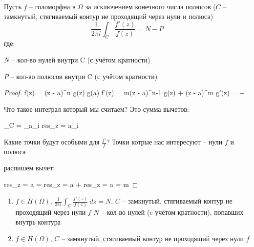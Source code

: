 \begin{theorem}
	Пусть $f$ -- голоморфна в $\Omega$ за исключением конечного числа полюсов ($C$ -- замкнутый, стягиваемый
	контур не проходящий через нули и полюса)
	\[ \frac{1}{2\pi i} \int_C \frac{f'(z)}{f(z)} = N - P \]
	где:
		
		$N$ -- кол-во нулей внутри C (с учётом кратности)

		$P$ -- кол-во полюсов внутри C (с учётом кратности)
\end{theorem}

\begin{proof}
	f(z) = (z - a)^n g(z) \quad g(a) 
	f'(z) = m(z - a)^{n-1} g(z) + (z - a)^m g'(z)
	 =  + 

	Что такое интеграл который мы считаем? Это сумма вычетов:

	 \int _C  = \sum_{a_i } res_{z = a_i} \frac{f'}{f]}

	Какие точки будут особыми для $\frac{f'}{f}$?
	Точки котрые нас интересуют -- нули $f$ и полюса

	распишем вычет:

	res_{z = a}  = res_{z = a}  + res_{z = a}  = m

\end{proof}

\begin{enumerate}
	\item $f \in H(\Omega)$, $\frac{1}{2 \pi i } \int_C \frac{f'(z)}{f(z)} \ dz = N$, $C$ -- замкнутый, стягиваемый
	контур не проходящий через нули $f$
	$N$ -- кол-во нулей (c учётом кратности), попавших внутрь контура
	\item $f \in H(\Omega)$, $C$ -- замкнутый, стягиваемый
	контур не проходящий через нули $f$

\end{enumerate}


